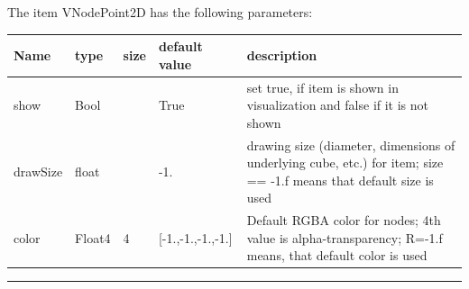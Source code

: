 The item VNodePoint2D has the following parameters:\vspace{-1cm}\\ 
\begin{center}
  \footnotesize
  \begin{longtable}{| p{4.5cm} | p{2.5cm} | p{0.5cm} | p{2.5cm} | p{6cm} |}
    \hline
    \bf Name & \bf type & \bf size & \bf default value & \bf description \\ \hline
    show &     Bool &      &     True &     set true, if item is shown in visualization and false if it is not shown\\ \hline
    drawSize &     float &      &     -1. &     drawing size (diameter, dimensions of underlying cube, etc.)  for item; size == -1.f means that default size is used\\ \hline
    color &     Float4 &     4 &     [-1.,-1.,-1.,-1.] &     Default RGBA color for nodes; 4th value is alpha-transparency; R=-1.f means, that default color is used\\ \hline
	  \end{longtable}
	\end{center}
\par\noindent\rule{\textwidth}{0.4pt}
\label{description_NodePoint2D}

